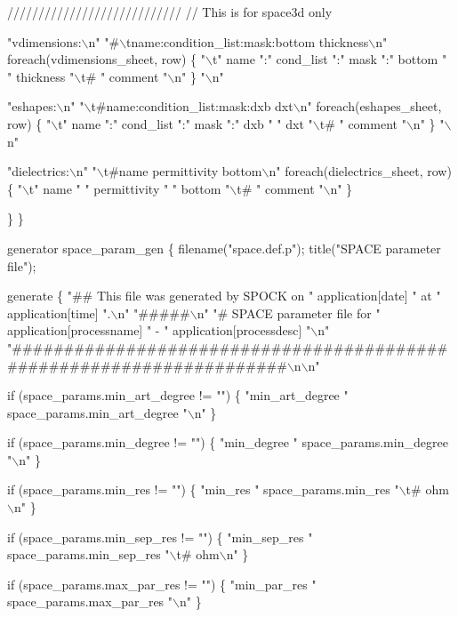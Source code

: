        ////////////////////////////
        // This is for space3d only

        "vdimensions:\(\backslash\)n"
         "#\(\backslash\)tname:condition_list:mask:bottom thickness\(\backslash\)n"
         foreach(vdimensions_sheet, row) \{
            "\(\backslash\)t" name ":" cond_list ":" mask ":" bottom " " thickness "\(\backslash\)t# " comment "\(\backslash\)n"
         \}
         "\(\backslash\)n"

        "eshapes:\(\backslash\)n"
        "\(\backslash\)t#name:condition_list:mask:dxb dxt\(\backslash\)n"
        foreach(eshapes_sheet, row) \{
            "\(\backslash\)t" name ":" cond_list ":" mask ":" dxb " " dxt "\(\backslash\)t# " comment "\(\backslash\)n"
        \}
        "\(\backslash\)n"

        "dielectrics:\(\backslash\)n"
        "\(\backslash\)t#name permittivity bottom\(\backslash\)n"
        foreach(dielectrics_sheet, row) \{
            "\(\backslash\)t" name " " permittivity " " bottom "\(\backslash\)t# " comment "\(\backslash\)n"
        \}

    \}
\}

generator space_param_gen
\{
    filename("space.def.p");
    title("SPACE parameter file");

    generate \{
        "## This file was generated by SPOCK on " application[date]
        " at " application[time] ".\(\backslash\)n"
        "#####\(\backslash\)n"
        "# SPACE parameter file for " application[processname] " - " application[processdesc] "\(\backslash\)n"
        "#####################################################################\(\backslash\)n\(\backslash\)n"

        if (space_params.min_art_degree != "") \{
            "min_art_degree      " space_params.min_art_degree "\(\backslash\)n"
        \}

        if (space_params.min_degree != "") \{
            "min_degree          " space_params.min_degree "\(\backslash\)n"
        \}

        if (space_params.min_res != "") \{
            "min_res             " space_params.min_res "\(\backslash\)t# ohm\(\backslash\)n"
        \}

        if (space_params.min_sep_res != "") \{
            "min_sep_res         " space_params.min_sep_res "\(\backslash\)t# ohm\(\backslash\)n"
        \}

        if (space_params.max_par_res != "") \{
            "min_par_res         " space_params.max_par_res "\(\backslash\)n"
        \}


